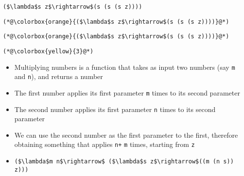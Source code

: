 \documentclass{beamer}
\begin{document}
\begin{frame}[fragile]{\CurrentSection}
\lstset{basicstyle=\ttfamily\small}\lstset{numbers=none}\lstset{language=ML}\begin{lstlisting}
($\lambda$s z$\rightarrow$(s (s (s z))))
\end{lstlisting}
\pause\lstset{language=ML}\begin{lstlisting}
(*@\colorbox{orange}{($\lambda$s z$\rightarrow$(s (s (s z))))}@*)
\end{lstlisting}

\end{frame}

\begin{frame}[fragile]{\CurrentSection}
\lstset{basicstyle=\ttfamily\small}\lstset{numbers=none}\lstset{language=ML}\begin{lstlisting}
(*@\colorbox{orange}{($\lambda$s z$\rightarrow$(s (s (s z))))}@*)
\end{lstlisting}
\pause\lstset{language=ML}\begin{lstlisting}
(*@\colorbox{yellow}{3}@*)
\end{lstlisting}

\end{frame}

\begin{frame}[fragile]{\CurrentSection}
\begin{block}{\CurrentSubSection}
\begin{itemize}
\item Multiplying numbers is a function that takes as input two numbers (say \texttt{m} and \texttt{n}), and returns a number
\item The first number applies its first parameter \texttt{m} times to its second parameter
\item The second number applies its first parameter \texttt{n} times to its second parameter
\item We can use the second number as the first parameter to the first, therefore obtaining something that applies \texttt{n+} \texttt{m} times, starting from \texttt{z}
\item \lstset{basicstyle=\ttfamily\small}\lstset{numbers=none}\lstset{language=ML}\begin{lstlisting}
($\lambda$m n$\rightarrow$ ($\lambda$s z$\rightarrow$((m (n s)) z)))
\end{lstlisting}


\end{itemize}

\end{block}


\end{frame}
\end{document}
